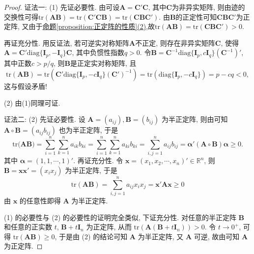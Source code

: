 \documentclass[../../main.tex]{subfiles}
\begin{document}
\begin{proof}
{\color{blue}证法一:}
(1) 先证必要性. 由可设$\boldsymbol{A}=\boldsymbol{C}'\boldsymbol{C}$, 其中$\boldsymbol{C}$为非异实矩阵, 则由迹的交换性可得$\text{tr}(\boldsymbol{A}\boldsymbol{B}) = \text{tr}(\boldsymbol{C}'\boldsymbol{C}\boldsymbol{B}) = \text{tr}(\boldsymbol{C}\boldsymbol{B}\boldsymbol{C}')$. 由$\boldsymbol{B}$的正定性可知$\boldsymbol{C}\boldsymbol{B}\boldsymbol{C}'$为正定阵, 又由于\hyperref[proposition:正定阵的性质]{命题\ref{proposition:正定阵的性质}(2)},故$\text{tr}(\boldsymbol{A}\boldsymbol{B}) = \text{tr}(\boldsymbol{C}\boldsymbol{B}\boldsymbol{C}')>0$.

再证充分性. 用反证法, 若可逆实对称矩阵$\boldsymbol{A}$不正定, 则存在非异实矩阵$\boldsymbol{C}$, 使得$\boldsymbol{A}=\boldsymbol{C}'\text{diag}\{\boldsymbol{I}_p, -\boldsymbol{I}_q\}\boldsymbol{C}$, 其中负惯性指数$q > 0$. 令$\boldsymbol{B}=\boldsymbol{C}^{-1}\text{diag}\{\boldsymbol{I}_p, c\boldsymbol{I}_q\}(\boldsymbol{C}^{-1})'$, 其中正数$c > p/q$, 则$\boldsymbol{B}$是正定实对称矩阵, 且
\[
\text{tr}(\boldsymbol{A}\boldsymbol{B}) = \text{tr}\left(\boldsymbol{C}'\text{diag}\{\boldsymbol{I}_p, -c\boldsymbol{I}_q\}(\boldsymbol{C}')^{-1}\right) = \text{tr}(\text{diag}\{\boldsymbol{I}_p, -c\boldsymbol{I}_q\}) = p - cq < 0,
\]
这与假设矛盾!

(2) 由(1)同理可证. 

{\color{blue}证法二:}
(2) 先证必要性. 设 \(\boldsymbol{A}=(a_{ij}),\boldsymbol{B}=(b_{ij})\) 为半正定阵, 则由可知 \(\boldsymbol{A}\circ\boldsymbol{B}=(a_{ij}b_{ij})\) 也为半正定阵, 于是
\[\mathrm{tr(}\boldsymbol{AB})=\sum_{i=1}^n{\sum_{k=1}^n{a_{ik}b_{ki}}}=\sum_{i=1}^n{\sum_{k=1}^n{a_{ki}b_{ki}}}=\sum_{i,j=1}^n{a_{ij}b_{ij}}=\boldsymbol{\alpha }'(\boldsymbol{A}\circ \boldsymbol{B})\boldsymbol{\alpha }\ge 0.\]
其中 \(\boldsymbol{\alpha}=(1,1,\cdots,1)'\). 再证充分性. 令 \(\boldsymbol{x}=(x_1,x_2,\cdots,x_n)'\in\mathbb{R}^n\), 则 \(\boldsymbol{B}=\boldsymbol{x}\boldsymbol{x}'=(x_ix_j)\) 为半正定阵, 于是
\[\mathrm{tr}(\boldsymbol{A}\boldsymbol{B})=\sum_{i,j = 1}^{n}a_{ij}x_ix_j=\boldsymbol{x}'\boldsymbol{A}\boldsymbol{x}\geq0\]
由 \(\boldsymbol{x}\) 的任意性即得 \(\boldsymbol{A}\) 为半正定阵.

(1) 的必要性与 (2) 的必要性的证明完全类似, 下证充分性. 对任意的半正定阵 \(\boldsymbol{B}\) 和任意的正实数 \(t\), \(\boldsymbol{B}+t\boldsymbol{I}_n\) 为正定阵, 从而 \(\mathrm{tr}(\boldsymbol{A}(\boldsymbol{B}+t\boldsymbol{I}_n))>0\). 令 \(t\to0^+\), 可得 \(\mathrm{tr}(\boldsymbol{A}\boldsymbol{B})\geq0\), 于是由 (2) 的结论可知 \(\boldsymbol{A}\) 为半正定阵, 又 \(\boldsymbol{A}\) 可逆, 故由可知 \(\boldsymbol{A}\) 为正定阵.


\end{proof}
\end{document}
